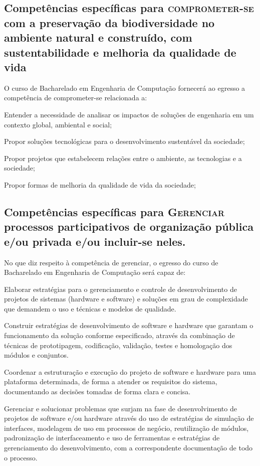 \subsection*{Competências específicas para \textsc{comprometer-se} com a preservação da biodiversidade no ambiente natural e construído, com sustentabilidade e melhoria da qualidade de vida}

O curso de Bacharelado em Engenharia de Computação fornecerá ao egresso a competência de comprometer-se relacionada a:

\begin{compitem}
    \item Entender a necessidade de analisar os impactos de soluções de engenharia em um contexto global, ambiental e social;%
    \item Propor soluções tecnológicas para o desenvolvimento sustentável da sociedade; %
    \item Propor projetos que estabelecem relações entre o ambiente, as tecnologias e a sociedade;
    \item Propor formas de melhoria da qualidade de vida da sociedade;
\end{compitem}

\subsection*{Competências específicas para \textsc{Gerenciar} processos participativos de organização pública e/ou privada e/ou incluir-se neles.}

No que diz respeito à competência de gerenciar, o egresso do curso de Bacharelado em Engenharia de Computação será capaz de:

\begin{compitem}
    \item Elaborar estratégias para o gerenciamento e controle de desenvolvimento de projetos de sistemas (hardware e software) e soluções em grau de complexidade que demandem o uso e técnicas e modelos de qualidade.
    \item Construir estratégias de desenvolvimento de software e hardware que garantam o funcionamento da solução conforme especificado, através da combinação de técnicas de prototipagem, codificação, validação, testes e homologação dos módulos e conjuntos.
    \item Coordenar a estruturação e execução do projeto de software e hardware para uma plataforma determinada, de forma a atender os requisitos do sistema, documentando as decisões tomadas de forma clara e concisa.
    \item Gerenciar e solucionar problemas que surjam na fase de desenvolvimento de projetos de software e/ou hardware através do uso de estratégias de simulação de interfaces, modelagem de uso em processos de negócio, reutilização de módulos, padronização de interfaceamento e uso de ferramentas e estratégias de gerenciamento do desenvolvimento, com a correspondente documentação de todo o processo.
\end{compitem}

